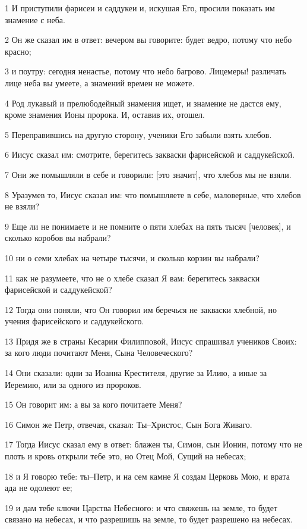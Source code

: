 \par 1 И приступили фарисеи и саддукеи и, искушая Его, просили показать им знамение с неба.
\par 2 Он же сказал им в ответ: вечером вы говорите: будет ведро, потому что небо красно;
\par 3 и поутру: сегодня ненастье, потому что небо багрово. Лицемеры! различать лице неба вы умеете, а знамений времен не можете.
\par 4 Род лукавый и прелюбодейный знамения ищет, и знамение не дастся ему, кроме знамения Ионы пророка. И, оставив их, отошел.
\par 5 Переправившись на другую сторону, ученики Его забыли взять хлебов.
\par 6 Иисус сказал им: смотрите, берегитесь закваски фарисейской и саддукейской.
\par 7 Они же помышляли в себе и говорили: [это значит], что хлебов мы не взяли.
\par 8 Уразумев то, Иисус сказал им: что помышляете в себе, маловерные, что хлебов не взяли?
\par 9 Еще ли не понимаете и не помните о пяти хлебах на пять тысяч [человек], и сколько коробов вы набрали?
\par 10 ни о семи хлебах на четыре тысячи, и сколько корзин вы набрали?
\par 11 как не разумеете, что не о хлебе сказал Я вам: берегитесь закваски фарисейской и саддукейской?
\par 12 Тогда они поняли, что Он говорил им беречься не закваски хлебной, но учения фарисейского и саддукейского.
\par 13 Придя же в страны Кесарии Филипповой, Иисус спрашивал учеников Своих: за кого люди почитают Меня, Сына Человеческого?
\par 14 Они сказали: одни за Иоанна Крестителя, другие за Илию, а иные за Иеремию, или за одного из пророков.
\par 15 Он говорит им: а вы за кого почитаете Меня?
\par 16 Симон же Петр, отвечая, сказал: Ты--Христос, Сын Бога Живаго.
\par 17 Тогда Иисус сказал ему в ответ: блажен ты, Симон, сын Ионин, потому что не плоть и кровь открыли тебе это, но Отец Мой, Сущий на небесах;
\par 18 и Я говорю тебе: ты--Петр, и на сем камне Я создам Церковь Мою, и врата ада не одолеют ее;
\par 19 и дам тебе ключи Царства Небесного: и что свяжешь на земле, то будет связано на небесах, и что разрешишь на земле, то будет разрешено на небесах.
